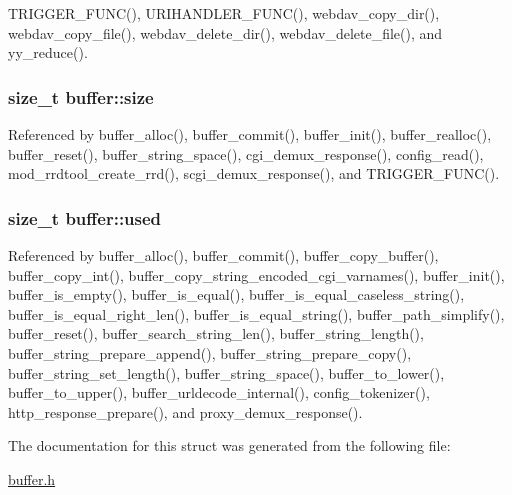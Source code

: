 T\-R\-I\-G\-G\-E\-R\-\_\-\-F\-U\-N\-C(), U\-R\-I\-H\-A\-N\-D\-L\-E\-R\-\_\-\-F\-U\-N\-C(), webdav\-\_\-copy\-\_\-dir(), webdav\-\_\-copy\-\_\-file(), webdav\-\_\-delete\-\_\-dir(), webdav\-\_\-delete\-\_\-file(), and yy\-\_\-reduce().

\hypertarget{structbuffer_abcf45ad6ca930a5656076f0d1d2343a9}{
\subsubsection[{size}]{\setlength{\rightskip}{0pt plus 5cm}size\-\_\-t buffer\-::size}}\label{structbuffer_abcf45ad6ca930a5656076f0d1d2343a9}


Referenced by buffer\-\_\-alloc(), buffer\-\_\-commit(), buffer\-\_\-init(), buffer\-\_\-realloc(), buffer\-\_\-reset(), buffer\-\_\-string\-\_\-space(), cgi\-\_\-demux\-\_\-response(), config\-\_\-read(), mod\-\_\-rrdtool\-\_\-create\-\_\-rrd(), scgi\-\_\-demux\-\_\-response(), and T\-R\-I\-G\-G\-E\-R\-\_\-\-F\-U\-N\-C().

\hypertarget{structbuffer_a4ee8efaf722ddf4773f45476eddd5a79}{
\subsubsection[{used}]{\setlength{\rightskip}{0pt plus 5cm}size\-\_\-t buffer\-::used}}\label{structbuffer_a4ee8efaf722ddf4773f45476eddd5a79}


Referenced by buffer\-\_\-alloc(), buffer\-\_\-commit(), buffer\-\_\-copy\-\_\-buffer(), buffer\-\_\-copy\-\_\-int(), buffer\-\_\-copy\-\_\-string\-\_\-encoded\-\_\-cgi\-\_\-varnames(), buffer\-\_\-init(), buffer\-\_\-is\-\_\-empty(), buffer\-\_\-is\-\_\-equal(), buffer\-\_\-is\-\_\-equal\-\_\-caseless\-\_\-string(), buffer\-\_\-is\-\_\-equal\-\_\-right\-\_\-len(), buffer\-\_\-is\-\_\-equal\-\_\-string(), buffer\-\_\-path\-\_\-simplify(), buffer\-\_\-reset(), buffer\-\_\-search\-\_\-string\-\_\-len(), buffer\-\_\-string\-\_\-length(), buffer\-\_\-string\-\_\-prepare\-\_\-append(), buffer\-\_\-string\-\_\-prepare\-\_\-copy(), buffer\-\_\-string\-\_\-set\-\_\-length(), buffer\-\_\-string\-\_\-space(), buffer\-\_\-to\-\_\-lower(), buffer\-\_\-to\-\_\-upper(), buffer\-\_\-urldecode\-\_\-internal(), config\-\_\-tokenizer(), http\-\_\-response\-\_\-prepare(), and proxy\-\_\-demux\-\_\-response().



The documentation for this struct was generated from the following file\-:\begin{DoxyCompactItemize}
\item 
\hyperlink{buffer_8h}{buffer.\-h}\end{DoxyCompactItemize}
